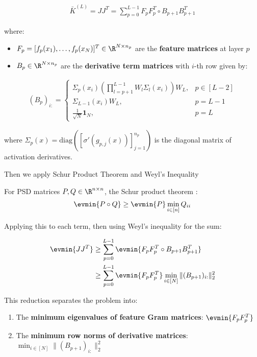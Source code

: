 \begin{align}
\bar{K}^{(L)} = JJ^T = \sum_{p=0}^{L-1} F_p F_p^T \circ B_{p+1} B_{p+1}^T
\end{align}

where:
\begin{itemize}
    \item $F_p = [f_p(x_1), \ldots, f_p(x_N)]^T \in \R^{N \times n_p}$ are the \textbf{feature matrices} at layer $p$
    \item $B_p \in \R^{N \times n_p}$ are the \textbf{derivative term matrices} with $i$-th row given by:
\end{itemize}

\begin{align}
(B_p)_{i:} = \begin{cases}
\Sigma_p(x_i) \left(\prod_{l=p+1}^{L-1} W_l \Sigma_l(x_i)\right) W_L, & p \in [L-2] \\
\Sigma_{L-1}(x_i) W_L, & p = L-1 \\
\frac{1}{\sqrt{N}} \mathbf{1}_N, & p = L
\end{cases}
\end{align}

where $\Sigma_p(x) = \text{diag}([\sigma'(g_{p,j}(x))]_{j=1}^{n_p})$ is the diagonal matrix of activation derivatives.

Then we apply Schur Product Theorem and Weyl's Inequality

For PSD matrices $P, Q \in \R^{n \times n}$, the Schur product theorem :
\begin{align}
\evmin{P \circ Q} \geq \evmin{P} \min_{i \in [n]} Q_{ii}
\end{align}

Applying this to each term, then using Weyl's inequality for the sum:

\begin{align}
\evmin{JJ^T} &\geq \sum_{p=0}^{L-1} \evmin{F_p F_p^T \circ B_{p+1} B_{p+1}^T} \\
&\geq \sum_{p=0}^{L-1} \evmin{F_p F_p^T} \min_{i \in [N]} \|(B_{p+1})_{i:}\|_2^2
\end{align}

This reduction separates the problem into:
\begin{enumerate}
    \item The \textbf{minimum eigenvalues of feature Gram matrices}: $\evmin{F_p F_p^T}$
    \item The \textbf{minimum row norms of derivative matrices}: $\min_{i \in [N]} \|(B_{p+1})_{i:}\|_2^2$
\end{enumerate}

